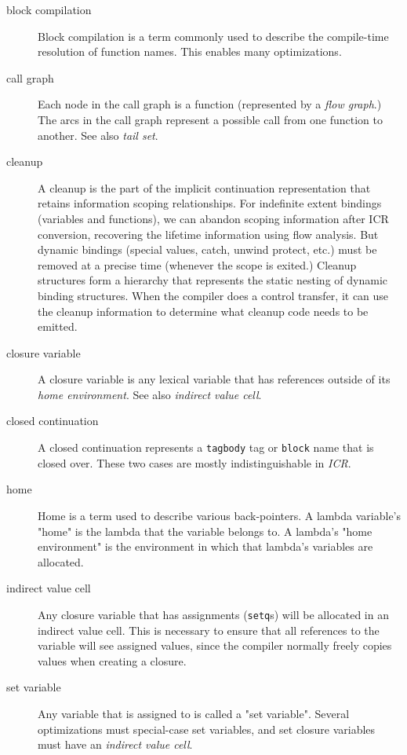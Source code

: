 \begin{description}
\item[block compilation] Block compilation is a term commonly used to describe
the compile-time resolution of function names.  This enables many
optimizations.

\item[call graph]
Each node in the call graph is a function (represented by a {\it flow graph}.)
The arcs in the call graph represent a possible call from one function to
another.  See also {\it tail set}.

\item[cleanup]
A cleanup is the part of the implicit continuation representation that
retains information scoping relationships.  For indefinite extent bindings
(variables and functions), we can abandon scoping information after ICR
conversion, recovering the lifetime information using flow analysis.  But
dynamic bindings (special values, catch, unwind protect, etc.) must be
removed at a precise time (whenever the scope is exited.)  Cleanup
structures form a hierarchy that represents the static nesting of dynamic
binding structures.  When the compiler does a control transfer, it can use
the cleanup information to determine what cleanup code needs to be emitted.

\item[closure variable]
A closure variable is any lexical variable that has references outside of
its {\it home environment}.  See also {\it indirect value cell}.

\item[closed continuation] A closed continuation represents a {\tt tagbody} tag
or {\tt block} name that is closed over.  These two cases are mostly
indistinguishable in {\it ICR}.

\item[home] Home is a term used to describe various back-pointers.  A lambda
variable's "home" is the lambda that the variable belongs to.  A lambda's "home
environment" is the environment in which that lambda's variables are allocated.

\item[indirect value cell]
Any closure variable that has assignments ({\tt setq}s) will be allocated in an
indirect value cell.  This is necessary to ensure that all references to
the variable will see assigned values, since the compiler normally freely
copies values when creating a closure.

\item[set variable] Any variable that is assigned to is called a "set
variable".  Several optimizations must special-case set variables, and set
closure variables must have an {\it indirect value cell}.


\end{description}
